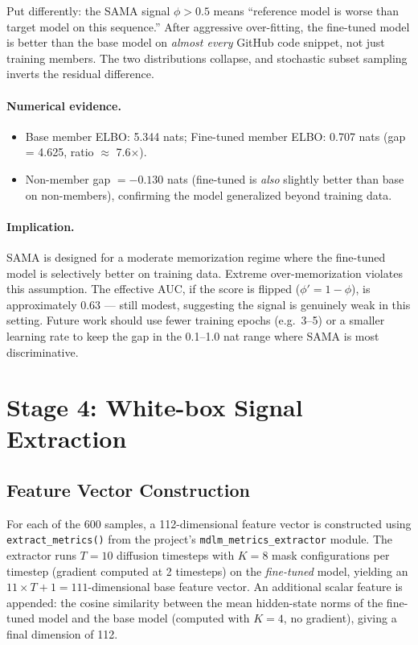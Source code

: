 \documentclass[11pt,a4paper]{article}
\begin{document}
Put differently: the SAMA signal $\phi > 0.5$ means ``reference model is worse
than target model on this sequence.''  After aggressive over-fitting,
the fine-tuned model is better than the base model on \emph{almost every}
GitHub code snippet, not just training members.  The two distributions collapse,
and stochastic subset sampling inverts the residual difference.

\paragraph{Numerical evidence.}
\begin{itemize}
  \item Base member ELBO: 5.344 nats; Fine-tuned member ELBO: 0.707 nats
        (gap = 4.625, ratio $\approx$ 7.6$\times$).
  \item Non-member gap $= -0.130$ nats (fine-tuned is \emph{also} slightly
        better than base on non-members), confirming the model generalized
        beyond training data.
\end{itemize}

\paragraph{Implication.}
SAMA is designed for a moderate memorization regime where the fine-tuned model
is selectively better on training data.  Extreme over-memorization violates
this assumption.  The effective AUC, if the score is flipped ($\phi' = 1 -
\phi$), is approximately 0.63 --- still modest, suggesting the signal is
genuinely weak in this setting.  Future work should use fewer training epochs
(e.g.\ 3--5) or a smaller learning rate to keep the gap in the 0.1--1.0 nat
range where SAMA is most discriminative.

\section{Stage 4: White-box Signal Extraction}

\subsection{Feature Vector Construction}

For each of the 600 samples, a 112-dimensional feature vector is constructed
using \texttt{extract\_metrics()} from the project's
\texttt{mdlm\_metrics\_extractor} module.
The extractor runs $T = 10$ diffusion timesteps with $K = 8$ mask configurations
per timestep (gradient computed at 2 timesteps) on the \emph{fine-tuned} model,
yielding an $11 \times T + 1 = 111$-dimensional base feature vector.
An additional scalar feature is appended: the cosine similarity between the
mean hidden-state norms of the fine-tuned model and the base model
(computed with $K = 4$, no gradient), giving a final dimension of 112.
\end{document}
